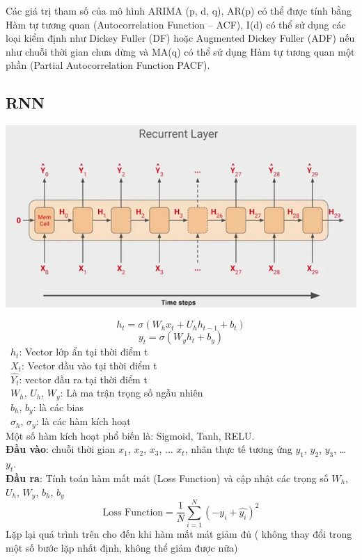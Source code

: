 Các giá trị tham số của mô hình ARIMA (p, d, q), AR(p) có thể được tính bằng Hàm tự tương quan (Autocorrelation Function – ACF), I(d) có thể sử dụng các loại kiểm định như Dickey Fuller (DF) hoặc Augmented Dickey Fuller (ADF) nếu như chuỗi thời gian chưa dừng và MA(q) có thể sử dụng Hàm tự tương quan một phần (Partial Autocorrelation Function PACF).

\subsection{RNN}
\begin{minipage}{0.45\textwidth}
\centering
\includegraphics[width=1\textwidth]{resources/chapter-4/rnn-1.png}
\end{minipage}
\[h_t = \sigma (W_{h}x_{t} + U_h h_{t-1} + b_t) \]
\[y_t = \sigma (W_{y} h_t + b_y)\]
    \indent\textbullet\ \(h_t\): Vector lớp ẩn tại thời điểm t\\
    \indent\textbullet\ \(X_t\): Vector đầu vào tại thời điểm t\\
    \indent\textbullet\ \(\widehat{Y_t}\): vector đầu ra tại thời điểm t\\
    \indent\textbullet\ \(W_h\), \(U_h\), \(W_y\): Là ma trận trọng số ngẫu nhiên\\
    \indent\textbullet\ \(b_h\), \(b_y\): là các bias\\
    \indent\textbullet\ \(\sigma_h\), \(\sigma_y\): là các hàm kích hoạt\\
Một số hàm kích hoạt phổ biến là: Sigmoid, Tanh, RELU.\\
\textbf{Đầu vào}: chuỗi thời gian \(x_1\), \(x_2\), \(x_3\), ... \(x_t\), nhãn thực tế tương ứng \(y_1\), \(y_2\), \(y_3\), … \(y_t\).\\
\textbf{Đầu ra}: Tính toán hàm mất mát (Loss Function) và cập nhật các trọng số \(W_h\), \(U_h\), \(W_y\), \(b_h\), \(b_y\)
\[\text{Loss Function} = \frac{1}{N} \sum_{i=1}^{N} (-y_i + \hat{y_i})^2\]
Lặp lại quá trình trên cho đến khi hàm mất mát giảm đủ ( không thay đổi trong một số bước lặp nhất định, không thể giảm được nữa)
